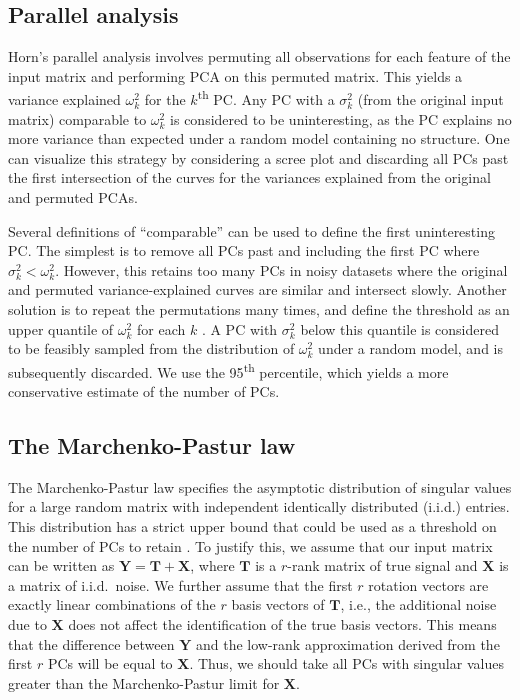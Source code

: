 \documentclass[10pt,letterpaper]{article}
\begin{document}
\subsection{Parallel analysis}
Horn's parallel analysis \cite{horn1965rationale} involves permuting all observations for each feature of the input matrix and performing PCA on this permuted matrix.
This yields a variance explained $\omega^2_k$ for the $k$\textsuperscript{th} PC.
Any PC with a $\sigma^2_k$ (from the original input matrix) comparable to $\omega^2_k$ is considered to be uninteresting, 
as the PC explains no more variance than expected under a random model containing no structure. 
One can visualize this strategy by considering a scree plot and discarding all PCs past the first intersection of the curves for the variances explained from the original and permuted PCAs.

Several definitions of ``comparable'' can be used to define the first uninteresting PC.
The simplest is to remove all PCs past and including the first PC where $\sigma^2_k < \omega^2_k$.
However, this retains too many PCs in noisy datasets where the original and permuted variance-explained curves are similar and intersect slowly.
Another solution is to repeat the permutations many times, and define the threshold as an upper quantile of $\omega^2_k$ for each $k$ \cite{buja1992remarks}.
A PC with $\sigma^2_k$ below this quantile is considered to be feasibly sampled from the distribution of $\omega^2_k$ under a random model, and is subsequently discarded.
We use the 95\textsuperscript{th} percentile, which yields a more conservative estimate of the number of PCs.

\subsection{The Marchenko-Pastur law}
The Marchenko-Pastur law \cite{marchenko1967distribution} specifies the asymptotic distribution of singular values for a large random matrix with independent identically distributed (i.i.d.) entries.
This distribution has a strict upper bound that could be used as a threshold on the number of PCs to retain \cite{shekhar2016comprehensive}.
To justify this, we assume that our input matrix can be written as $\mathbf{Y} = \mathbf{T} + \mathbf{X}$, where $\mathbf{T}$ is a $r$-rank matrix of true signal and $\mathbf{X}$ is a matrix of i.i.d.\ noise.
We further assume that the first $r$ rotation vectors are exactly linear combinations of the $r$ basis vectors of $\mathbf{T}$,
i.e., the additional noise due to $\mathbf{X}$ does not affect the identification of the true basis vectors.
This means that the difference between $\mathbf{Y}$ and the low-rank approximation derived from the first $r$ PCs will be equal to $\mathbf{X}$.
Thus, we should take all PCs with singular values greater than the Marchenko-Pastur limit for $\mathbf{X}$.
\end{document}
